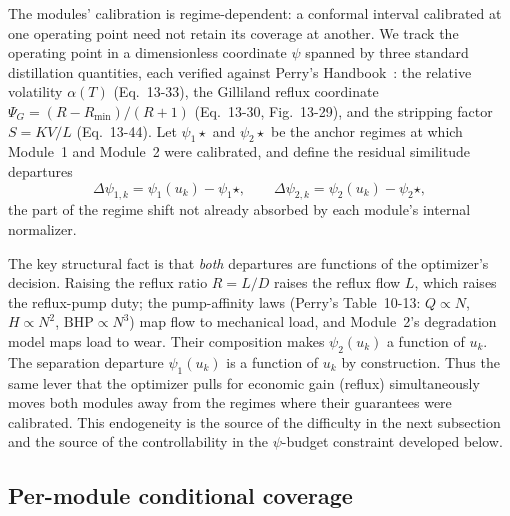 The modules' calibration is regime-dependent: a conformal interval calibrated at
one operating point need not retain its coverage at another. We track the
operating point in a dimensionless coordinate $\psi$ spanned by three standard
distillation quantities, each verified against Perry's Handbook~\citep{perrys}:
the relative volatility $\alpha(T)$ (Eq.~13-33), the Gilliland reflux coordinate
$\Psi_G = (R - R_{\min})/(R+1)$ (Eq.~13-30, Fig.~13-29), and the stripping factor
$S = KV/L$ (Eq.~13-44). Let $\psi_1\!\star$ and $\psi_2\!\star$ be the anchor
regimes at which Module~1 and Module~2 were calibrated, and define the residual
similitude departures
\begin{equation}
\Delta\psi_{1,k} = \psi_1(u_k) - \psi_1\!\star, \qquad
\Delta\psi_{2,k} = \psi_2(u_k) - \psi_2\!\star,
\label{eq:departure}
\end{equation}
the part of the regime shift not already absorbed by each module's internal
normalizer.

The key structural fact is that \emph{both} departures are functions of the
optimizer's decision. Raising the reflux ratio $R = L/D$ raises the reflux flow
$L$, which raises the reflux-pump duty; the pump-affinity laws (Perry's
Table~10-13: $Q \propto N$, $H \propto N^2$, $\mathrm{BHP} \propto N^3$) map flow
to mechanical load, and Module~2's degradation model maps load to wear. Their
composition makes $\psi_2(u_k)$ a function of $u_k$. The separation departure
$\psi_1(u_k)$ is a function of $u_k$ by construction. Thus the same lever that
the optimizer pulls for economic gain (reflux) simultaneously moves both
modules away from the regimes where their guarantees were calibrated. This endogeneity is the source of the difficulty in the next subsection and the
source of the controllability in the $\psi$-budget constraint developed below.

\subsection{Per-module conditional coverage}
\label{sec:permodule}

